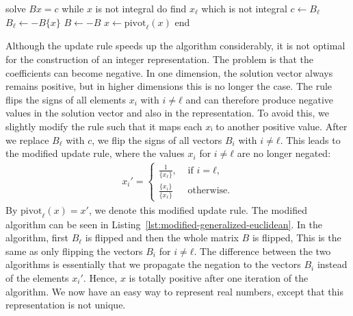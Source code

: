 \begin{Pseudocode}[
    float=tbp,
    label={lst:modified-generalized-euclidean},
    caption={
      The modified algorithm, where the solution $x$ remains entirely positive in each iterations.
      The linear system from the original algorithm is replaced by the update rule.
      The two negations ensure that the vectors represent the correct solution,
      when the modified update rule from Equation~\ref{eq:modified-update-rule} is used.
    }]
solve $Bx = c$
while $x$ is not integral do
  find $x_ℓ$ which is not integral
  $c ← B_ℓ$
  $B_ℓ ← -B\{x\}$
  $B ← -B$
  $x ← \mathrm{pivot}_ℓ(x)$
end
\end{Pseudocode}

Although the update rule speeds up the algorithm considerably, it is not
optimal for the construction of an integer representation.
The problem is that the coefficients can become negative.
In one dimension, the solution vector always remains positive,
but in higher dimensions this is no longer the case.
The rule flips the signs of all elements $x_i$ with $i ≠ ℓ$
and can therefore produce negative values in the solution vector and also in the representation.
To avoid this, we slightly modify the rule such that it maps each $xᵢ$ to another positive value.
After we replace $B_ℓ$ with $c$, we flip the signs of all vectors $B_i$ with $i ≠ ℓ$.
This leads to the modified update rule, where the values $x_i$ for $i ≠ ℓ$ are
no longer negated:
\begin{align}
  \label{eq:modified-update-rule}
  x_i' =
  \begin{cases}
    \frac{1}{\{x_ℓ\}},  & \text{ if } i = ℓ, \\
    \frac{\{x_i\}}{\{x_ℓ\}} & \text{ otherwise.}
  \end{cases}
\end{align}
By $\mathrm{pivot}_ℓ(x) = x'$, we denote this modified update rule.
The modified algorithm can be seen in Listing~\ref{lst:modified-generalized-euclidean}.
In the algorithm, first $B_ℓ$ is flipped and then the whole matrix $B$ is flipped,
This is the same as only flipping the vectors $B_i$ for $i ≠ ℓ$.
The difference between the two algorithms is essentially that we propagate the
negation to the vectors $B_i$ instead of the elements $x_i'$.
Hence, $x$ is totally positive after one iteration of the algorithm.
We now have an easy way to represent real numbers,
except that this representation is not unique.


